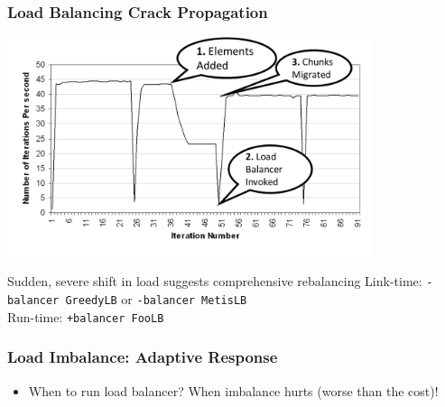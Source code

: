 \begin{frame}[fragile]
\frametitle{Load Balancing Crack Propagation}
\begin{centering}
\includegraphics[width=0.8\textwidth]{../figures/LButilizationCrackPropWithAnnotation}
\end{centering}
\begin{block}{Sudden, severe shift in load suggests comprehensive rebalancing}
Link-time: \texttt{-balancer GreedyLB} or \texttt{-balancer MetisLB} \\
Run-time: \texttt{+balancer FooLB}
\end{block}
\end{frame}


\begin{frame}
\frametitle{Load Imbalance: Adaptive Response}
\begin{itemize}
\item When to run load balancer? \pause When imbalance hurts (worse than the cost)!
\end{itemize}
\end{frame}

